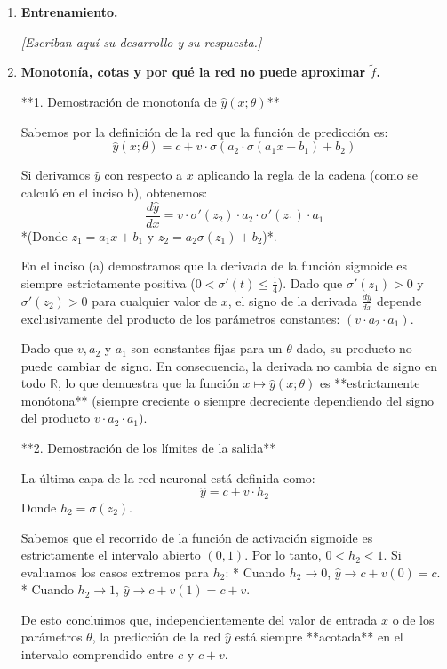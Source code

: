 \documentclass{article}
\newcommand\pendiente{{\color{gris90}\itshape [Escriban aquí su desarrollo y su respuesta.]}}
\begin{document}
\begin{enumerate}[label=\roman*., widest=ii]
  \item \textbf{Entrenamiento.}

  \pendiente

  \item \textbf{Monotonía, cotas y por qué la red no puede aproximar $\tilde{f}$.}

  **1. Demostración de monotonía de $\hat{y}(x;\theta)$**

Sabemos por la definición de la red que la función de predicción es:
$$ \hat{y}(x; \theta) = c + v \cdot \sigma(a_2 \cdot \sigma(a_1x + b_1) + b_2) $$

Si derivamos $\hat{y}$ con respecto a $x$ aplicando la regla de la cadena (como se calculó en el inciso b), obtenemos:
$$ \frac{d\hat{y}}{dx} = v \cdot \sigma'(z_2) \cdot a_2 \cdot \sigma'(z_1) \cdot a_1 $$
*(Donde $z_1 = a_1x + b_1$ y $z_2 = a_2\sigma(z_1) + b_2$)*.

En el inciso (a) demostramos que la derivada de la función sigmoide es siempre estrictamente positiva ($0 < \sigma'(t) \le \frac{1}{4}$). Dado que $\sigma'(z_1) > 0$ y $\sigma'(z_2) > 0$ para cualquier valor de $x$, el signo de la derivada $\frac{d\hat{y}}{dx}$ depende exclusivamente del producto de los parámetros constantes: $(v \cdot a_2 \cdot a_1)$.

Dado que $v, a_2$ y $a_1$ son constantes fijas para un $\theta$ dado, su producto no puede cambiar de signo. En consecuencia, la derivada no cambia de signo en todo $\mathbb{R}$, lo que demuestra que la función $x \mapsto \hat{y}(x;\theta)$ es **estrictamente monótona** (siempre creciente o siempre decreciente dependiendo del signo del producto $v \cdot a_2 \cdot a_1$).

**2. Demostración de los límites de la salida**

La última capa de la red neuronal está definida como:
$$ \hat{y} = c + v \cdot h_2 $$
Donde $h_2 = \sigma(z_2)$. 

Sabemos que el recorrido de la función de activación sigmoide es estrictamente el intervalo abierto $(0, 1)$. Por lo tanto, $0 < h_2 < 1$. 
Si evaluamos los casos extremos para $h_2$:
* Cuando $h_2 \to 0$, $\hat{y} \to c + v(0) = c$.
* Cuando $h_2 \to 1$, $\hat{y} \to c + v(1) = c + v$.

De esto concluimos que, independientemente del valor de entrada $x$ o de los parámetros $\theta$, la predicción de la red $\hat{y}$ está siempre **acotada** en el intervalo comprendido entre $c$ y $c+v$.


\end{enumerate}
\end{document}
